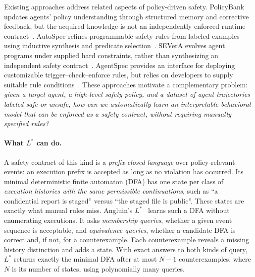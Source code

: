 Existing approaches address related aspects of policy-driven safety. PolicyBank updates agents' policy understanding through structured memory and corrective feedback, but the acquired knowledge is not an independently enforced runtime contract~\cite{choi2026policybank}. AutoSpec refines programmable safety rules from labeled examples using inductive synthesis and predicate selection~\cite{ma2026autospec}. SEVerA evolves agent programs under supplied hard constraints, rather than synthesizing an independent safety contract~\cite{banerjee2026severa}. AgentSpec provides an interface for deploying customizable trigger--check--enforce rules, but relies on developers to supply suitable rule conditions~\cite{wang2026agentspec}. These approaches motivate a complementary problem: \emph{given a target agent, a high-level safety policy, and a dataset of agent trajectories labeled safe or unsafe, how can we automatically learn an interpretable behavioral model that can be enforced as a safety contract, without requiring manually specified rules?}

\paragraph{What $L^*$ can do.}
A safety contract of this kind is a \emph{prefix-closed language} over policy-relevant events: an execution prefix is accepted as long as no violation has occurred. Its minimal deterministic finite automaton (DFA) has one state per class of \emph{execution histories with the same permissible continuations}, such as ``a confidential report is staged'' versus ``the staged file is public''. These states are exactly what manual rules miss. Angluin's $L^*$~\cite{angluin1987learning} learns such a DFA without enumerating executions. It asks \emph{membership queries}, whether a given event sequence is acceptable, and \emph{equivalence queries}, whether a candidate DFA is correct and, if not, for a counterexample. Each counterexample reveals a missing history distinction and adds a state. With exact answers to both kinds of query, $L^*$ returns exactly the minimal DFA after at most $N-1$ counterexamples, where $N$ is its number of states, using polynomially many queries.

